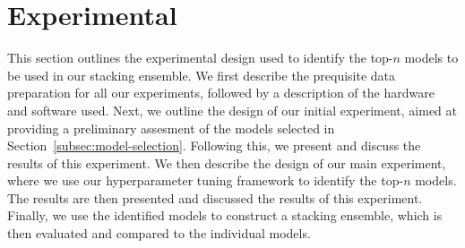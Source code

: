 \section{Experimental}\label{sec:methodology}
This section outlines the experimental design used to identify the top-$n$ models to be used in our stacking ensemble.
We first describe the prequisite data preparation for all our experiments, followed by a description of the hardware and software used.
Next, we outline the design of our initial experiment, aimed at providing a preliminary assesment of the models selected in Section~\ref{subsec:model-selection}.
Following this, we present and discuss the results of this experiment.
We then describe the design of our main experiment, where we use our hyperparameter tuning framework to identify the top-$n$ models.
The results are then presented and discussed the results of this experiment.
Finally, we use the identified models to construct a stacking ensemble, which is then evaluated and compared to the individual models.




